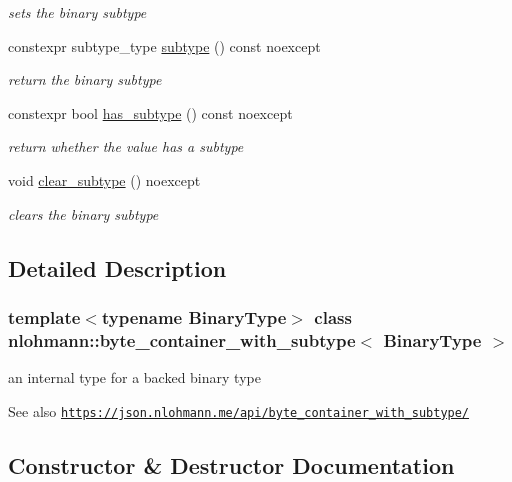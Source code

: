\begin{DoxyCompactItemize}
\begin{DoxyCompactList}\small\item\em sets the binary subtype \end{DoxyCompactList}\item 
constexpr subtype\+\_\+type \hyperlink{classnlohmann_1_1byte__container__with__subtype_abe68a969df28c8cb0b63355b4d38ec1a}{subtype} () const noexcept
\begin{DoxyCompactList}\small\item\em return the binary subtype \end{DoxyCompactList}\item 
constexpr bool \hyperlink{classnlohmann_1_1byte__container__with__subtype_a9fc42fb07003bf7048c2f1fc79478e02}{has\+\_\+subtype} () const noexcept
\begin{DoxyCompactList}\small\item\em return whether the value has a subtype \end{DoxyCompactList}\item 
void \hyperlink{classnlohmann_1_1byte__container__with__subtype_a7b122b28ff2b8680557ca44ac9748e49}{clear\+\_\+subtype} () noexcept
\begin{DoxyCompactList}\small\item\em clears the binary subtype \end{DoxyCompactList}\end{DoxyCompactItemize}


\subsection{Detailed Description}
\subsubsection*{template$<$typename Binary\+Type$>$\newline
class nlohmann\+::byte\+\_\+container\+\_\+with\+\_\+subtype$<$ Binary\+Type $>$}

an internal type for a backed binary type 

\begin{DoxySeeAlso}{See also}
\href{https://json.nlohmann.me/api/byte_container_with_subtype/}{\tt https\+://json.\+nlohmann.\+me/api/byte\+\_\+container\+\_\+with\+\_\+subtype/} 
\end{DoxySeeAlso}


\subsection{Constructor \& Destructor Documentation}
\mbox{\label{classnlohmann_1_1byte__container__with__subtype_a89c78caf8c7b54dc1bcfa4b0b23d2fc8}} 
